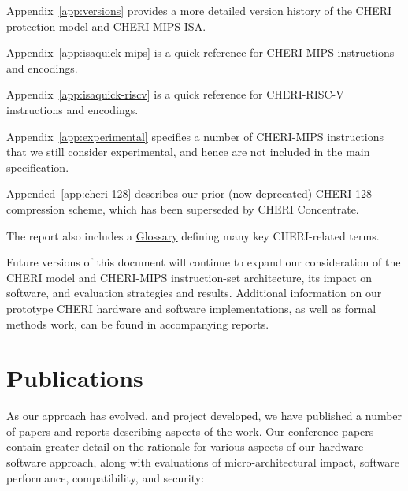 \medskip
\noindent
Appendix~\ref{app:versions} provides a more detailed version history of the
CHERI protection model and CHERI-MIPS ISA.

\medskip
\noindent
Appendix~\ref{app:isaquick-mips} is a quick reference for CHERI-MIPS
instructions and encodings.

\medskip
\noindent
Appendix~\ref{app:isaquick-riscv} is a quick reference for CHERI-RISC-V
instructions and encodings.

\medskip
\noindent
Appendix~\ref{app:experimental} specifies a number of CHERI-MIPS instructions
that we still consider experimental, and hence are not included in the main
specification.

\medskip
\noindent
Appended~\ref{app:cheri-128} describes our prior (now deprecated) CHERI-128
compression scheme, which has been superseded by CHERI Concentrate.

\medskip
\noindent
The report also includes a \hyperref[glossary]{Glossary} defining many key
CHERI-related terms.

\medskip

Future versions of this document will continue to expand our
consideration of the CHERI model and CHERI-MIPS instruction-set architecture,
its impact on software, and evaluation strategies and results.
Additional information on our prototype CHERI hardware and software
implementations, as well as formal methods work, can be found in accompanying
reports.

\section{Publications}
\label{sec:publications}

As our approach has evolved, and project developed, we have published a number
of papers and reports describing aspects of the work.
Our conference papers contain greater detail on the rationale for various
aspects of our hardware-software approach, along with evaluations of
micro-architectural impact, software performance, compatibility, and security:

